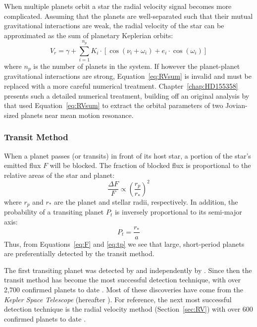When multiple planets orbit a star the radial velocity signal becomes more complicated.
Assuming that the planets are well-separated such that their mutual gravitational interactions are weak, the radial velocity of the star can be approximated as the sum of planetary Keplerian orbits:
\begin{equation}
V_r = \gamma + \sum_{i=1}^{n_p} K_i \cdot [\cos(\nu_i + \omega_i) + e_i\cdot \cos(\omega_i)]
\label{eq:RVsum}
\end{equation}
where $n_p$ is the number of planets in the system. 
If however the planet-planet gravitational interactions are strong, Equation~\ref{eq:RVsum} is invalid and must be replaced with a more careful numerical treatment. 
Chapter~\ref{chap:HD155358} presents such a detailed numerical treatment, building off an original analysis by \citet{Robertson2012} that used Equation~\ref{eq:RVsum} to extract the orbital parameters of two Jovian-sized planets near mean motion resonance. 

\subsubsection{Transit Method}
\label{sec:transit}
When a planet passes (or transits) in front of its host star, a portion of the star's emitted flux $F$ will be blocked. 
The fraction of blocked flux is proportional to the relative areas of the star and planet:
\begin{equation}
\frac{\Delta F}{F} \propto \left(\frac{r_p}{r_*}\right)^2
\label{eq:F}
\end{equation}
where $r_p$ and $r_*$ are the planet and stellar radii, respectively. 
In addition, the probability of a transiting planet $P_t$ is inversely proportional to its semi-major axis:
\begin{equation}
P_t = \frac{r_*}{a}
\label{eq:tp}
\end{equation}
Thus, from Equations~\ref{eq:F} and \ref{eq:tp} we see that large, short-period planets are preferentially detected by the transit method.

The first transiting planet was detected by \citet{Henry1999} and independently by \citet{Charbonneau2000}.
Since then the transit method has become the most successful detection technique, with over 2,700 confirmed planets to date \citep{NASAEA}. 
Most of these discoveries have come from the \textit{Kepler Space Telescope} (hereafter \kep).
For reference, the next most successful detection technique is the radial velocity method (Section~\ref{sec:RV}) with over 600 confirmed planets to date \citep{NASAEA}.

